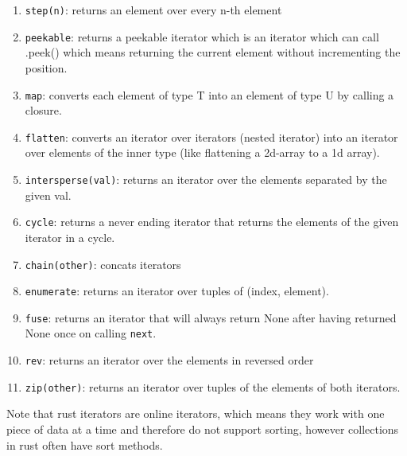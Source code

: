 \begin{enumerate}
    \item \lstinline{step(n)}: returns an element over every n-th element
    \item \lstinline{peekable}: returns a peekable iterator which is an iterator which can call .peek() which means returning the current element without incrementing the position.
    \item \lstinline{map}: converts each element of type T into an element of type U by calling a closure.
    \item \lstinline{flatten}: converts an iterator over iterators (nested iterator) into an iterator over elements of the inner type (like flattening a 2d-array to a 1d array).
    \item \lstinline{intersperse(val)}: returns an iterator over the elements separated by the given val.
    \item \lstinline{cycle}: returns a never ending iterator that returns the elements of the given iterator in a cycle.
    \item \lstinline{chain(other)}: concats iterators
    \item \lstinline{enumerate}: returns an iterator over tuples of (index, element).
    \item \lstinline{fuse}: returns an iterator that will always return None after having returned None once on calling \lstinline{next}.
    \item \lstinline{rev}: returns an iterator over the elements in reversed order
    \item \lstinline{zip(other)}: returns an iterator over tuples of the elements of both iterators.
\end{enumerate}

Note that rust iterators are online iterators, which means they work with one piece of data at a time and therefore do not support sorting, however collections in rust often have sort methods.


